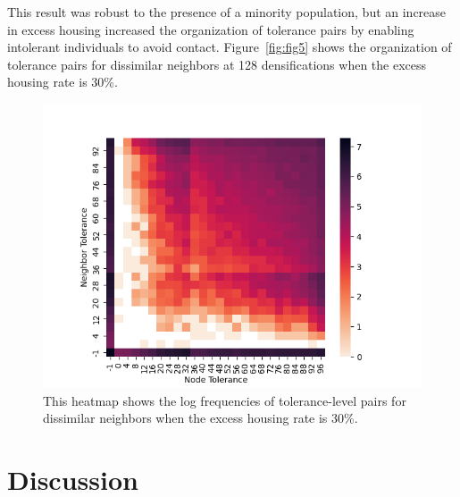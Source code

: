 \documentclass[a4paper]{article}
\begin{document}
This result was robust to the presence of a minority population, but an increase in excess housing increased the organization of tolerance pairs by enabling intolerant individuals to avoid contact. Figure~\ref{fig:fig5} shows the organization of tolerance pairs for dissimilar neighbors at 128 densifications when the excess housing rate is 30\%.

\begin{figure}[H]
    \centering
    \includegraphics[width=.7\textwidth]{128vacheatmap.png}
    \caption{This heatmap shows the log frequencies of tolerance-level pairs for dissimilar neighbors when the excess housing rate is 30\%.}
    \label{fig:fighm}
\end{figure}

\section{Discussion}
\end{document}
